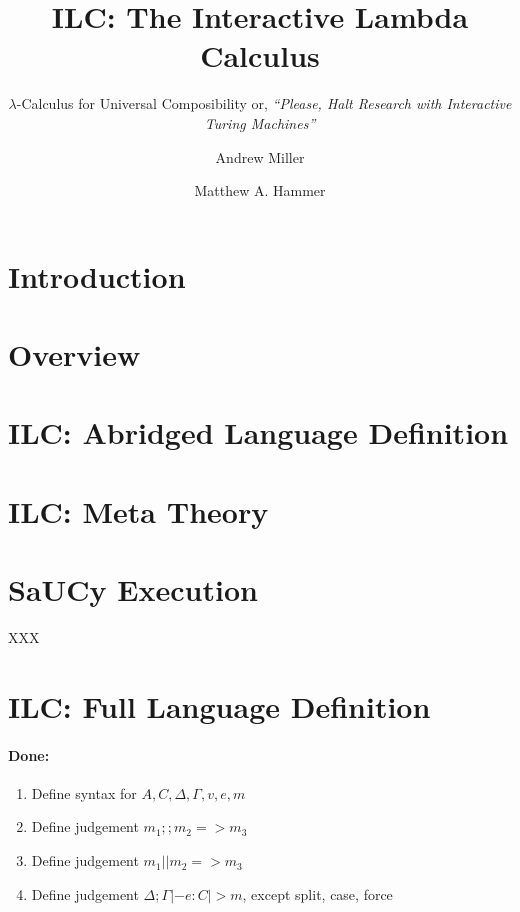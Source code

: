 \documentclass{llncs}
\title{ILC: The Interactive Lambda Calculus}
\subtitle{$\lambda$-Calculus for Universal Composibility
  or, \emph{``Please, Halt Research with Interactive Turing Machines''}
}
\author{Andrew Miller\inst{1} \and Matthew A. Hammer\inst{2}}
\institute{University of Illinois \and University of Colorado Boulder}
\begin{document}
\maketitle

\begin{abstract}

\end{abstract}

\section{Introduction}

\section{Overview}

\section{ILC: Abridged Language Definition}

\section{ILC: Meta Theory}

\section{SaUCy Execution}


\begin{theorem}
\label{thm:read-det}
XXX
\end{theorem}

\appendix
\section{ILC: Full Language Definition}


\paragraph{Done:}
\begin{enumerate}
\item Define syntax for $A, C, \Delta, \Gamma, v, e, m$
\item Define judgement $m_1 ;; m_2 => m_3$
\item Define judgement $m_1 || m_2 => m_3$
\item Define judgement $\Delta; \Gamma |- e : C |> m$, except split, case, force
\end{enumerate}
\end{document}
